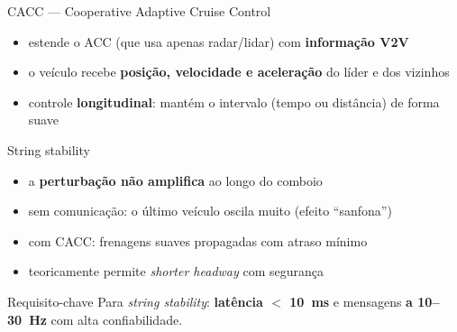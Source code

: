 \documentclass[aspectratio=169,11pt]{beamer}
\begin{document}
\begin{frame}{CACC --- Cooperative Adaptive Cruise Control}
  \begin{itemize}
    \item estende o ACC (que usa apenas radar/lidar) com \textbf{informação V2V}
    \item o veículo recebe \textbf{posição, velocidade e aceleração} do líder e dos vizinhos
    \item controle \textbf{longitudinal}: mantém o intervalo (tempo ou distância) de forma suave
  \end{itemize}
  \begin{block}{String stability}
    \begin{itemize}
      \item a \textbf{perturbação não amplifica} ao longo do comboio
      \item sem comunicação: o último veículo oscila muito (efeito ``sanfona'')
      \item com CACC: frenagens suaves propagadas com atraso mínimo
      \item teoricamente permite \emph{shorter headway} com segurança
    \end{itemize}
  \end{block}
  \begin{alertblock}{Requisito-chave}
    Para \emph{string stability}: \textbf{latência $<$ 10~ms} e mensagens \textbf{a 10--30~Hz} com alta confiabilidade.
  \end{alertblock}
\end{frame}
\end{document}
